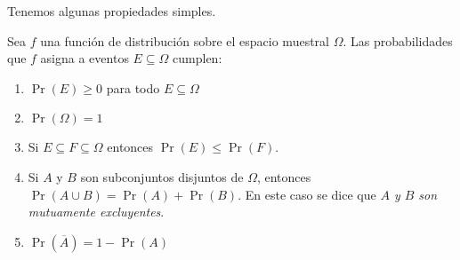   Tenemos algunas propiedades simples.
  \begin{theorem}
    \label{theo:properties-probabilities-events}
    Sea \(f\) una función de distribución
    sobre el espacio muestral \(\Omega\).
    Las probabilidades que \(f\)
    asigna a eventos \(E \subseteq \Omega\)
    cumplen:
    \begin{enumerate}
    \item
      \label{item:nonnegative}
      \(\Pr(E) \ge 0\) para todo \(E \subseteq \Omega\)
    \item
      \label{item:universe=1}
      \(\Pr(\Omega) = 1\)
    \item
      \label{item:subset}
      Si \(E \subseteq F \subseteq \Omega\)
      entonces \(\Pr(E) \le \Pr(F)\).
    \item
      \label{item:disjoint-union}
      Si \(A\) y \(B\) son subconjuntos disjuntos de \(\Omega\),
      entonces \(\Pr(A \cup B) = \Pr(A) + \Pr(B)\).
      En este caso se dice
      que \emph{\(A\) y \(B\) son mutuamente excluyentes}.%
    \item
      \label{item:complement}
      \(\Pr(\overline{A}) = 1 - \Pr(A)\)
    \end{enumerate}
  \end{theorem}
